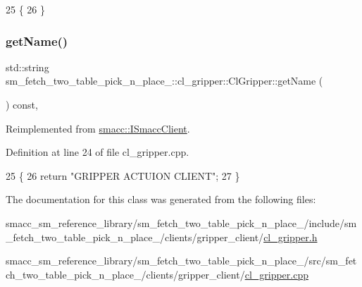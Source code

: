 \begin{DoxyCode}
25   \{
26   \}
\end{DoxyCode}
\mbox{\label{classsm__fetch__two__table__pick__n__place__1_1_1cl__gripper_1_1ClGripper_a2f6873bc11155e36252434cbbe43939e}} 
\subsubsection{\texorpdfstring{get\+Name()}{getName()}}
{\footnotesize\ttfamily std\+::string sm\+\_\+fetch\+\_\+two\+\_\+table\+\_\+pick\+\_\+n\+\_\+place\+\_\+::cl\+\_\+gripper\+::\+Cl\+Gripper\+::get\+Name (\begin{DoxyParamCaption}{ }\end{DoxyParamCaption}) const\hspace{0.3cm}{\ttfamily [override]}, {\ttfamily [virtual]}}



Reimplemented from \hyperlink{classsmacc_1_1ISmaccClient_a8c3ce19f182e71909c5dc6263d25be69}{smacc\+::\+I\+Smacc\+Client}.



Definition at line 24 of file cl\+\_\+gripper.\+cpp.


\begin{DoxyCode}
25 \{
26     \textcolor{keywordflow}{return} \textcolor{stringliteral}{"GRIPPER ACTUION CLIENT"};
27 \}
\end{DoxyCode}


The documentation for this class was generated from the following files\+:\begin{DoxyCompactItemize}
\item 
smacc\+\_\+sm\+\_\+reference\+\_\+library/sm\+\_\+fetch\+\_\+two\+\_\+table\+\_\+pick\+\_\+n\+\_\+place\+\_/include/sm\+\_\+fetch\+\_\+two\+\_\+table\+\_\+pick\+\_\+n\+\_\+place\+\_/clients/gripper\+\_\+client/\hyperlink{sm__fetch__two__table__pick__n__place__1_2include_2sm__fetch__two__table__pick__n__place__1_2clia04ff58373fc88c6872e3e7d8bbef2d3}{cl\+\_\+gripper.\+h}\item 
smacc\+\_\+sm\+\_\+reference\+\_\+library/sm\+\_\+fetch\+\_\+two\+\_\+table\+\_\+pick\+\_\+n\+\_\+place\+\_/src/sm\+\_\+fetch\+\_\+two\+\_\+table\+\_\+pick\+\_\+n\+\_\+place\+\_/clients/gripper\+\_\+client/\hyperlink{sm__fetch__two__table__pick__n__place__1_2src_2sm__fetch__two__table__pick__n__place__1_2clients262b1fe8a657fbcc9f8af5fe3d5419b4}{cl\+\_\+gripper.\+cpp}\end{DoxyCompactItemize}
